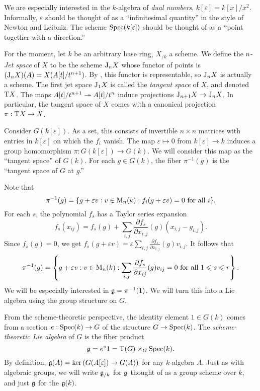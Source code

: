 We are especially interested in the $k$-algebra of \emph{dual numbers}, 
$k[\varepsilon]=k[x]/x^2$. Informally, $\varepsilon$ should be thought of as a 
``infinitesimal quantity'' in the style of Newton and Leibniz. The scheme 
$\operatorname{Spec}(k[\varepsilon])$ should be thought of as a ``point together with 
a direction.'' 

\begin{hard}
For the moment, let $k$ be an arbitrary base ring, $X_{/k}$ a scheme. We define 
the \emph{$n$-Jet space} of $X$ to be the scheme $\mathrm{J}_n X$ whose functor of 
points is $(\mathrm{J}_n X)(A) = X(A[t]/t^{n+1})$. By \cite{vojta-2007}, this 
functor is representable, so $\mathrm{J}_n X$ is actually a scheme. The first jet 
space $\mathrm{J}_1 X$ is called the \emph{tangent space} of $X$, and denoted 
$\mathrm{T} X$. The maps $A[t]/t^{n+1}\twoheadrightarrow A[t]/t^n$ induce projections 
$\mathrm{J}_{n+1} X\to \mathrm{J}_n X$. In particular, the tangent space of $X$ comes with 
a canonical projection $\pi:\mathrm{T} X\to X$. 
\end{hard}

Consider $G(k[\varepsilon])$. As a set, this consists of invertible $n\times n$ 
matrices with entries in $k[\varepsilon]$ on which the $f_i$ vanish. The map 
$\varepsilon\mapsto 0$ from $k[\varepsilon]\to k$ induces a group homomorphism 
$\pi:G(k[\varepsilon])\to G(k)$. We will consider this map as the ``tangent 
space'' of $G(k)$. For each $g\in G(k)$, the fiber 
$\pi^{-1}(g)$ is the ``tangent space of $G$ at $g$.'' 

Note that 
\[
  \pi^{-1}(g) = \{g+\varepsilon v:v\in \operatorname{M}_n(k):f_i(g+\varepsilon v)=0\text{ for all }i\} .
\]
For each $s$, the polynomial $f_s$ has a Taylor series expansion 
\[
  f_s(x_{i j}) = f_s(g) + \sum_{i,j} \frac{\partial f_s}{\partial x_{i,j}}(g) (x_{i,j}-g_{i,j}) .
\]
Since $f_s(g)=0$, we get 
$f_s(g+\varepsilon v) = \varepsilon \sum_{i,j} \frac{\partial f_s}{\partial x_{i,j}}(g) v_{i,j}$. 
It follows that 
\[
  \pi^{-1}(g) = \left\{g+\varepsilon v:v\in \operatorname{M}_n(k):\sum_{i,j} \frac{\partial f_s}{\partial x_{i j}}(g) v_{i j}=0\text{ for all }1\leqslant s\leqslant r\right\} .
\]
We will be especially interested in $\mathfrak{g}=\pi^{-1}(1)$. We will turn this into a 
Lie algebra using the group structure on $G$. 

\begin{hard}
From the scheme-theoretic perspective, the identity element $1\in G(k)$ comes 
from a section $e:\operatorname{Spec}(k)\to G$ of the structure $G\to \operatorname{Spec}(k)$. The 
\emph{scheme-theoretic Lie algebra} of $G$ is the fiber product 
\[
  \mathfrak{g} = e^\ast 1 = \mathrm{T}(G)\times_G \operatorname{Spec}(k) .
\]
By definition, $\mathfrak{g}(A)=\ker\left(G(A[\varepsilon])\to G(A)\right)$ for any 
$k$-algebra $A$. Just as with algebraic groups, we will write $\mathfrak{g}_{/k}$ for 
$\mathfrak{g}$ thought of as a group scheme 
over $k$, and just $\mathfrak{g}$ for the $\mathfrak{g}(k)$. 
\end{hard}

